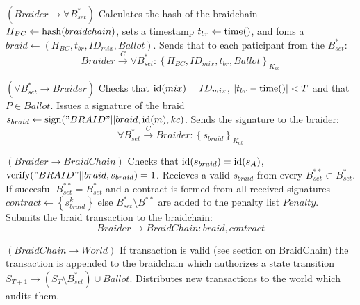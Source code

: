 \documentclass[12pt]{article}
\begin{document}
\begin{steps}
\item $(Braider \to \forall B^*_{set})$ Calculates the hash of the braidchain $H_{BC} \leftarrow {\rm hash}(braidchain)$, sets a timestamp $t_{br} \leftarrow {\rm time}()$, and foms a $braid \leftarrow (H_{BC}, t_{br}, ID_{mix}, Ballot)$. Sends that to each paticipant from the $B^*_{set}$:
  \begin{equation}
    Braider \overset{C}{\to} \forall B^*_{set}: \left\{ H_{BC}, ID_{mix}, t_{br}, Ballot \right\}_{K_{ab}}
  \end{equation}
\item $(\forall B^*_{set} \to Braider)$ Checks that ${\rm id}(mix) = ID_{mix}$, $|t_{br} - {\rm time}()|<T$ and that $P \in Ballot$. Issues a signature of the braid $s_{braid} \leftarrow {\rm sign}("BRAID"||braid, {\rm id}(m), kc)$. Sends the signature to the braider:
  \begin{equation}
    \forall B^*_{set} \overset{C}{\to} Braider : \left\{ s_{braid} \right\}_{K_{ab}}
  \end{equation}

\item $(Braider \to BraidChain)$ Checks that ${\rm id}(s_{braid})={\rm id}(s_A)$, ${\rm verify}("BRAID"|| braid, s_{braid})=1$. Recieves a valid $s_{braid}$ from every $B^{**}_{set} \subset B^*_{set}$. If succesful $B^{**}_{set} = B^{*}_{set}$ and a contract is formed from all received signatures $contract \leftarrow \left\{ s^k_{braid} \right\}$ else $B^{*}_{set} \setminus B^{**}$ are added to the penalty list $Penalty$. Submits the braid transaction to the braidchain:
  \begin{equation}
    Braider \to BraidChain: braid, contract
  \end{equation}

\item $(BraidChain \to World)$ If transaction is valid (see section on BraidChain) the transaction is appended to the braidchain which authorizes a state transition $S_{T+1} \to (S_T \setminus B^*_{set}) \cup Ballot$. Distributes new transactions to the world which audits them.  %



\end{steps}
\end{document}
